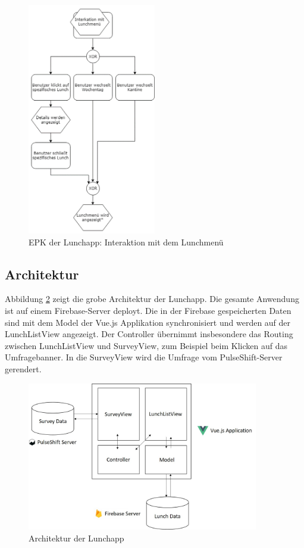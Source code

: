 \begin{figure}[H]
\centering
\includegraphics[width=0.5\textwidth]{images/lunchapp_epk_detail}
\caption[Interaktion mit dem Lunchmenü]{EPK der Lunchapp: Interaktion mit dem Lunchmenü}
\label{fig:lunchepkdetail}
\end{figure}

\subsection{Architektur}

Abbildung \ref{fig:laarchitecture} zeigt die grobe Architektur der Lunchapp. Die gesamte Anwendung ist auf einem Firebase-Server deployt. Die in der Firebase gespeicherten Daten sind mit dem Model der Vue.js Applikation synchronisiert und werden auf der LunchListView angezeigt. Der Controller übernimmt insbesondere das Routing zwischen LunchListView und SurveyView, zum Beispiel beim Klicken auf das Umfragebanner. In die SurveyView wird die Umfrage vom PulseShift-Server gerendert.   

\begin{figure}[H]
\centering
\includegraphics[width=0.9\textwidth]{images/lunchapp_architecture.jpg}
\caption[Architektur der Lunchapp]{Architektur der Lunchapp}
\label{fig:laarchitecture}
\end{figure}

